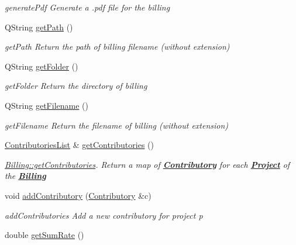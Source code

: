\begin{DoxyCompactItemize}
\begin{DoxyCompactList}\small\item\em generate\-Pdf Generate a .pdf file for the billing \end{DoxyCompactList}\item 
Q\-String \hyperlink{classModels_1_1Billing_a4110ac32d8d96b9fbd1b0037df39723b}{get\-Path} ()
\begin{DoxyCompactList}\small\item\em get\-Path Return the path of billing filename (without extension) \end{DoxyCompactList}\item 
Q\-String \hyperlink{classModels_1_1Billing_a2359afe641ba85a37729fb0d951bff7d}{get\-Folder} ()
\begin{DoxyCompactList}\small\item\em get\-Folder Return the directory of billing \end{DoxyCompactList}\item 
Q\-String \hyperlink{classModels_1_1Billing_ae8700d38ecd8e4975f1ee013144ed455}{get\-Filename} ()
\begin{DoxyCompactList}\small\item\em get\-Filename Return the filename of billing (without extension) \end{DoxyCompactList}\item 
\hyperlink{classModels_1_1ContributoriesList}{Contributories\-List} \& \hyperlink{classModels_1_1Billing_af3d66c06d8c4d855b0efa5ff599a3ceb}{get\-Contributories} ()
\begin{DoxyCompactList}\small\item\em \hyperlink{classModels_1_1Billing_af3d66c06d8c4d855b0efa5ff599a3ceb}{Billing\-::get\-Contributories}. Return a map of {\bfseries \hyperlink{classModels_1_1Contributory}{Contributory}} for each {\bfseries \hyperlink{classModels_1_1Project}{Project}} of the {\bfseries \hyperlink{classModels_1_1Billing}{Billing}} \end{DoxyCompactList}\item 
void \hyperlink{classModels_1_1Billing_a3636d785d2cb77d83d21a795e1f91a60}{add\-Contributory} (\hyperlink{classModels_1_1Contributory}{Contributory} \&c)
\begin{DoxyCompactList}\small\item\em add\-Contributories Add a new contributory for project p \end{DoxyCompactList}\item 
double \hyperlink{classModels_1_1Billing_ab12d213423acfe0e0b7b1f6b43a92e28}{get\-Sum\-Rate} ()

\end{DoxyCompactItemize}

